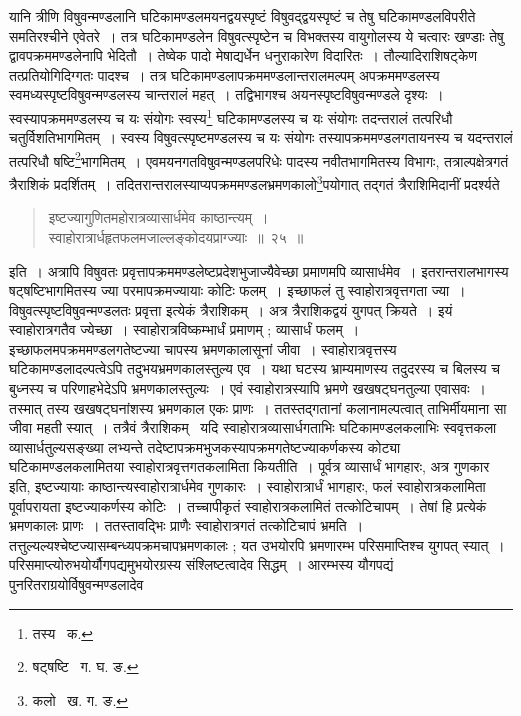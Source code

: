 \documentclass[11pt, openany]{book}
\begin{document}
\indent यानि त्रीणि विषुवन्मण्डलानि घटिकामण्डलमयनद्वयस्पृष्टं विषुवद्द्वयस्पृष्टं च तेषु घटिकामण्डलविपरीते समतिरश्चीने एवेतरे~। तत्र घटिकामण्डलेन विषुवत्स्पृष्टेन च विभक्तस्य वायुगोलस्य ये चत्वारः खण्डाः तेषु द्वावपक्रममण्डलेनापि भेदितौ~। तेष्वेक पादो मेषाद्यर्धेन धनुराकारेण विदारितः~। तौल्यादिराशिषट्केण तत्प्रतियोगिदिग्गतः पादश्च~। तत्र घटिकामण्डलापक्रममण्डलान्तरालमल्पम् अपक्रममण्डलस्य स्वमध्यस्पृष्टविषुवन्मण्डलस्य चान्तरालं महत्~। तद्विभागश्च अयनस्पृष्टविषुवन्मण्डले दृश्यः~। स्वस्यापक्रममण्डलस्य च यः संयोगः स्वस्य\renewcommand{\thefootnote}{२}\footnote{तस्य \textendash\ क.} घटिकामण्डलस्य च यः संयोगः तदन्तरालं तत्परिधौ चतुर्विशतिभागमितम्~। स्वस्य विषुवत्स्पृष्टमण्डलस्य च यः संयोगः तस्यापक्रममण्डलगतायनस्य च यदन्तरालं तत्परिधौ षष्टि\renewcommand{\thefootnote}{३}\footnote{षट्षष्टि \textendash\ ग. घ. ङ.}भागमितम्~। एवमयनगतविषुवन्मण्डलपरिधेः पादस्य नवीतभागमितस्य विभागः, तत्राल्पक्षेत्रगतं त्रैराशिकं प्रदर्शितम्~। तदितरान्तरालस्याप्यपक्रममण्डलभ्रमणकालो\renewcommand{\thefootnote}{४}\footnote{कलो \textendash\ ख. ग. ङ.}पयोगात् तद्गतं त्रैराशिमिदानीं प्रदर्श्यते\textendash 
\begin{quote}   
{\ab इष्टज्यागुणितमहोरात्रव्यासार्धमेव काष्ठान्त्यम्~। \\
स्वाहोरात्रार्धहृतफलमजाल्लङ्कोदयप्राग्ज्याः~॥~२५~॥} 
\end{quote}

\newpage

\indent इति~। अत्रापि विषुवतः प्रवृत्तापक्रममण्डलेष्टप्रदेशभुजाज्यैवेच्छा प्रमाणमपि व्यासार्धमेव~। इतरान्तरालभागस्य षट्षष्टिभागमितस्य ज्या 
परमापक्रमज्यायाः कोटिः फलम्~। इच्छाफलं तु स्वाहोरात्रवृत्तगता ज्या~। विषुवत्स्पृष्टविषुवन्मण्डलतः प्रवृत्ता इत्येकं त्रैराशिकम्~। अत्र
त्रैराशिकद्वयं युगपत् क्रियते~। इयं स्वाहोरात्रगतैव ज्येच्छा~। स्वाहोरात्रविष्कम्भार्धं प्रमाणम् ; व्यासार्धं फलम्~। इच्छाफलमपक्रममण्डलगतेष्टज्या चापस्य भ्रमणकालासूनां जीवा~। स्वाहोरात्रवृत्तस्य घटिकामण्डलादल्पत्वेऽपि तदुभयभ्रमणकालस्तुल्य एव~। यथा घटस्य भ्राम्यमाणस्य तदुदरस्य 
च बिलस्य च बुध्नस्य च परिणाहभेदेऽपि भ्रमणकालस्तुल्यः~। एवं स्वाहोरात्रस्यापि भ्रमणे खखषट्घनतुल्या एवासवः~। तस्मात् तस्य 
खखषट्घनांशस्य भ्रमणकाल एकः प्राणः~। ततस्तद्गतानां कलानामल्पत्वात् ताभिर्मीयमाना सा जीवा महती स्यात्~। तत्रैवं त्रैराशिकम् \textendash\ यदि स्वाहोरात्रव्यासार्धगताभिः घटिकामण्डलकलाभिः स्ववृत्तकला व्यासार्धतुल्यसङ्ख्या लभ्यन्ते तदेष्टापक्रमभुजकस्यापक्रमगतेष्टज्याकर्णकस्य कोट्या घटिकामण्डलकलामितया स्वाहोरात्रवृत्तगतकलामिता कियतीति~। पूर्वत्र व्यासार्धं भागहारः, अत्र गुणकार इति, इष्टज्यायाः
काष्ठान्त्यस्वाहोरात्रार्धमेव गुणकारः~। स्वाहोरात्रार्धं भागहारः, फलं स्वाहोरात्रकलामिता पूर्वापरायता इष्टज्याकर्णस्य कोटिः~। तच्चापीकृतं 
स्वाहोरात्रकलामितं तत्कोटिचापम्~। तेषां हि प्रत्येकं भ्रमणकालः प्राणः~। ततस्तावद्भिः प्राणैः स्वाहोरात्रगतं तत्कोटिचापं भ्रमति~।
तत्तुल्यल्यश्चेष्टज्यासम्बन्ध्यपक्रमचापभ्रमणकालः ; यत उभयोरपि भ्रमणारम्भ परिसमाप्तिश्च युगपत् स्यात्~।
परिसमाप्त्योरुभयोर्यौगपद्यमुभयोरग्रस्य संश्लिष्टत्वादेव सिद्धम्~। आरम्भस्य यौगपद्यं पुनरितराग्रयोर्विषुवन्मण्डलादेव
\end{document}
